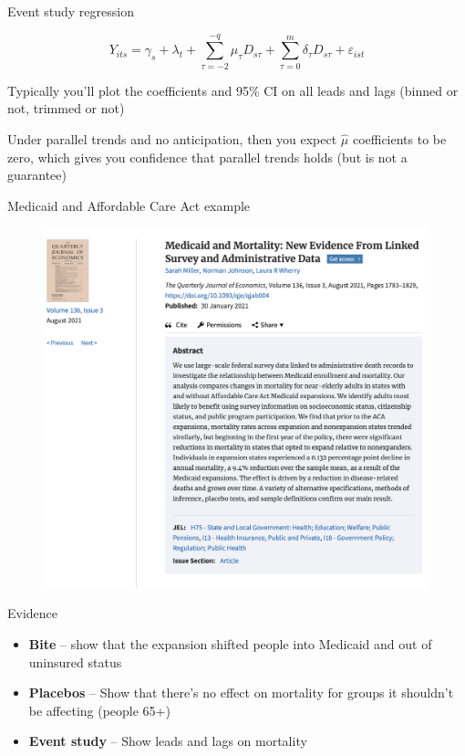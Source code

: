 \documentclass{beamer}
\begin{document}
\begin{frame}{Event study regression}


$$Y_{its} = \gamma_s + \lambda_t + \sum_{\tau=-2}^{-q}\mu_{\tau}D_{s\tau} + \sum_{\tau=0}^m\delta_{\tau}D_{s\tau}+\varepsilon_{ist}$$

\bigskip

Typically you'll plot the coefficients and 95\% CI on all leads and lags (binned or not, trimmed or not) 

\bigskip

Under parallel trends and no anticipation, then you expect $\widehat{\mu}$ coefficients to be zero, which gives you confidence that parallel trends holds (but is not a guarantee)

\end{frame}



\begin{frame}{Medicaid and Affordable Care Act example}

\begin{figure}
\includegraphics[scale=0.25]{./lecture_includes/medicaid_qje}
\end{figure}

\end{frame}

\begin{frame}{Evidence}

\begin{itemize}
\item \textbf{Bite} -- show that the expansion shifted people into Medicaid and out of uninsured status
\item \textbf{Placebos} -- Show that there's no effect on mortality for groups it shouldn't be affecting (people 65+)
\item \textbf{Event study} -- Show leads and lags on mortality
\end{itemize}

\end{frame}
\end{document}

